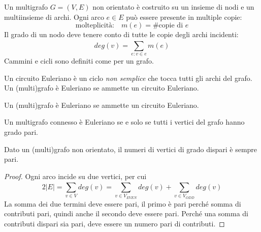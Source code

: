 \begin{definition}[Multigrafo]
    \label{def:multigrafo}
    Un multigrafo $G=(V,E)$ non orientato è costruito su un insieme di nodi e un multiinsieme di archi.
    Ogni arco $e \in E$ può essere presente in multiple copie:
    \begin{equation*}
        \text{molteplicità:}
        \quad
        m(e) = \text{\# copie di $e$}
    \end{equation*}
    Il grado di un nodo deve tenere conto di tutte le copie degli archi incidenti:
    \begin{equation*}
        deg(v) = \sum_{e : v \in e}^{} m(e)
    \end{equation*}
    Cammini e cicli sono definiti come per un grafo.
\end{definition}

\begin{definition}
    \label{def:circuitoeuleriano}
    Un circuito Euleriano è un ciclo \emph{non semplice} che tocca tutti gli archi del grafo.
    Un (multi)grafo è Euleriano se ammette un circuito Euleriano.
\end{definition}

\begin{definition}
    \label{def:grafoeuleriano}
    Un (multi)grafo è Euleriano se ammette un circuito Euleriano.
\end{definition}

\begin{theorem}
    \label{teo:grafoeuleriano}
    Un multigrafo connesso è Euleriano se e solo se tutti i vertici del grafo hanno grado pari.
\end{theorem}

\begin{proposizione}
    Dato un (multi)grafo non orientato, il numeri di vertici di grado dispari è sempre pari.
    \begin{proof}
        Ogni arco incide su due vertici, per cui
        \begin{equation*}
            2 |E| 
            =
            \sum_{v \in V}^{} deg(v)
            = 
            \sum_{v \in V_{EVEN}}^{} deg(v)
            +
            \sum_{v \in V_{ODD}}^{} deg(v)
        \end{equation*}
        La somma dei due termini deve essere pari,
        il primo è pari perché somma di contributi pari,
        quindi anche il secondo deve essere pari.
        Perché una somma di contributi dispari sia pari, deve essere un numero pari di contributi.
    \end{proof}
\end{proposizione}

